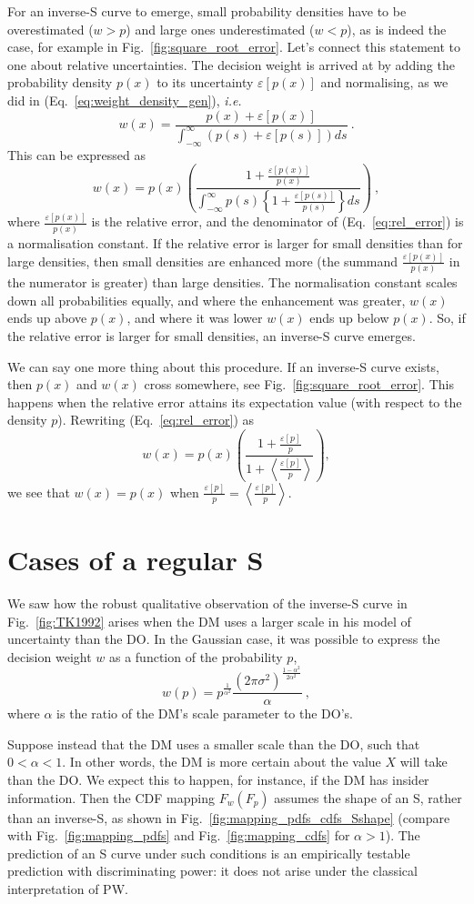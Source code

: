 \documentclass[a4paper, 12pt]{article}
\newcommand{\ave}[1]{\left\langle#1 \right\rangle}
\newcommand{\elabel}[1]{\label{eq:#1}}
\newcommand{\eref}[1]{(Eq.~\ref{eq:#1})}
\newcommand{\fref}[1]{Fig.~\ref{fig:#1}}
\newcommand{\seclabel}[1]{\label{sec:#1}}
\newcommand{\ie}{\textit{i.e.}\xspace}
\newcommand{\be}{\begin{equation}}
\newcommand{\ee}{\end{equation}}
\newcommand{\err}[1]{\varepsilon\left[#1\right]}
\begin{document}
For an inverse-S curve to emerge, small probability densities have to be overestimated ($w>p$) and large ones underestimated ($w<p$), as is indeed the case, for example in \fref{square_root_error}. Let's connect this statement to one about relative uncertainties. The decision weight is arrived at by adding the probability density $p(x)$ to its uncertainty $\err{p(x)}$ and normalising, as we did in \eref{weight_density_gen}, \ie
\be
w(x)=\frac{p(x)+\err{p(x)}}{\int_{-\infty}^{\infty} \left( p(s)+\err{p(s)} \right) ds}~.
\ee
This can be expressed as
\be
w(x)=p(x) \left(\frac{1+\frac{\err{p(x)}}{p(x)}}{\int_{-\infty}^{\infty} p(s)\left\{1+\frac{\err{p(s)}}{p(s)}\right\} ds}\right)~,
\elabel{rel_error}
\ee
where $\frac{\err{p(x)}}{p(x)}$ is the relative error, and the denominator of \eref{rel_error} is a normalisation constant. If the relative error is larger for small densities than for large densities, then small densities are enhanced more (the summand $\frac{\err{p(x)}}{p(x)}$ in the numerator is greater) than large densities. The normalisation constant scales down all probabilities equally, and where the enhancement was greater, $w(x)$ ends up above $p(x)$, and where it was lower $w(x)$ ends up below $p(x)$. So, if the relative error is larger for small densities, an inverse-S curve emerges.

We can say one more thing about this procedure. If an inverse-S curve exists, then $p(x)$ and $w(x)$ cross somewhere, see \fref{square_root_error}. This happens when the relative error attains its expectation value (with respect to the density $p$). Rewriting \eref{rel_error} as
\be
w(x)=p(x) \left(\frac{1+\frac{\err{p}}{p}}{1+\ave{\frac{\err{p}}{p}}}\right),
\ee
we see that $w(x)=p(x)$ when $\frac{\err{p}}{p}=\ave{\frac{\err{p}}{p}}.$

\newpage
\section{Cases of a regular S}
\seclabel{Scurve}

We saw how the robust qualitative observation of the inverse-S curve in \fref{TK1992} arises when the DM uses a larger scale in his model of uncertainty than the DO. In the Gaussian case, it was possible to express the decision weight $w$ as a function of the probability $p$,
\be
w(p)= p^{\frac{1}{\alpha^2}} \frac{\left(2\pi\sigma^2\right)^{\frac{1-\alpha^2}{2\alpha^2}}}{\alpha} ~,
\ee
where $\alpha$ is the ratio of the DM's scale parameter to the DO's.

Suppose instead that the DM uses a smaller scale than the DO, such that $0<\alpha<1$. In other words, the DM is more certain about the value $X$ will take than the DO. We expect this to happen, for instance, if the DM has insider information. Then the CDF mapping $F_w(F_p)$ assumes the shape of an S, rather than an inverse-S, as shown in \fref{mapping_pdfs_cdfs_Sshape} (compare with \fref{mapping_pdfs} and \fref{mapping_cdfs} for $\alpha>1$). The prediction of an S curve under such conditions is an empirically testable prediction with discriminating power: it does not arise under the classical interpretation of PW.
\end{document}
